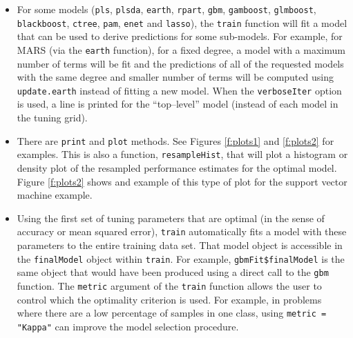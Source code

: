 \documentclass[12pt]{article}
\begin{document}
\begin{itemize}
   \item For some models (\texttt{pls}, \texttt{plsda}, \texttt{earth}, \texttt{rpart}, \texttt{gbm}, \texttt{gamboost}, \texttt{glmboost}, \texttt{blackboost}, \texttt{ctree}, \texttt{pam}, \texttt{enet} and \texttt{lasso}), the \texttt{train} function will fit a model that can be used to derive predictions for some sub-models. For example, for MARS (via the \texttt{earth} function), for a fixed degree, a model with a maximum number of terms will be fit and the predictions of all of the requested models with the same degree and smaller number of terms will be computed using \texttt{update.earth} instead of fitting a new model. When the \texttt{verboseIter} option is used, a line is printed for the ``top--level'' model (instead of each model in the tuning grid).

	\item There are \texttt{print} and \texttt{plot} methods. See Figures \ref{f:plots1} and \ref{f:plots2} for examples. This is also a function, \texttt{resampleHist}, that will plot a histogram or density plot of the resampled performance estimates for the optimal model. Figure \ref{f:plots2} shows and example of this type of plot for the support vector machine example.
	
	\item Using the first set of tuning parameters that are optimal (in the sense of accuracy or mean squared error), \texttt{train} automatically fits a model with these parameters to the entire training data set. That model object is accessible in the \texttt{finalModel} object within \texttt{train}. For example, \verb+gbmFit$finalModel+  is the same object that would have been produced using a direct call to the \texttt{gbm} function. The \texttt{metric} argument of the \texttt{train} function allows the user to control which the optimality criterion is used. For example, in problems where there are a low percentage of samples in one class, using \texttt{metric = "Kappa"} can improve the model selection procedure.
	
\end{itemize}
\end{document}
